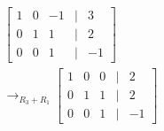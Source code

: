 \documentclass[preview]{standalone}
\begin{document}
\begin{align*}
\begin{bmatrix} 1 & 0 & -1 & | & 3 \\ 0 & 1 & 1 & | & 2 \\ 0 & 0 & 1 & | & -1 \end{bmatrix}\\ \rightarrow_{R_3 + R_1} \begin{bmatrix} 1 & 0 & 0 & | & 2 \\ 0 & 1 & 1 & | & 2 \\ 0 & 0 & 1 & | & -1 \end{bmatrix}
\end{align*}
\end{document}
